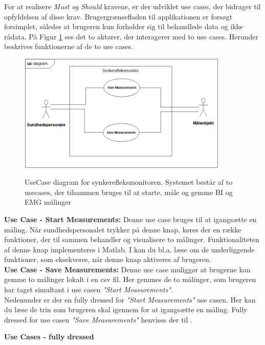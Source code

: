 \pagebreak
For at realisere \textit{Must og Should } kravene, er der udviklet use cases, der bidrager til opfyldelsen af disse krav. Brugergrænsefladen til applikationen er forsøgt forsimplet, således at brugeren kun forholder sig til behandlede data og ikke rådata. På Figur \ref{UseCaseV1} ses det to aktører, der interagerer med to use cases.  Herunder beskrives funktionerne af de to use cases. 


\begin{figure}[H]
\centering
{\includegraphics[width=10cm]
{Figure/usecasediagram}}
\caption{UseCase diagram for synkerefleksmonitoren. Systemet består af to usecases, der tilsammen bruges til at starte, måle og gemme BI og EMG målinger}
\label{UseCaseV1}
\end{figure}

\textbf{Use Case - Start Measurements:}
Denne use case bruges til at igangsætte en måling. Når sundhedspersonalet trykker på denne knap, køres der en række funktioner, der til sammen behandler og visualisere to målinger. Funktionaliteten af denne knap implementeres i Matlab. I   kan du bl.a. læse om de underliggende funktioner, som eksekveres, når denne knap aktiveres af brugeren.\\

\textbf{Use Case - Save Measurements:}
Denne use case muliggør at brugerne kan gemme to målinger lokalt i en csv fil. Her gemmes de to målinger, som brugeren har taget simultant i use casen \textit{"Start Measurements".} \\
 
 
 \pagebreak
Nedenunder er der en fully dressed for \textit{"Start Measurements"} use casen. Her kan du læse de trin som brugeren skal igennem for at igangsætte en måling. Fully dressed for use casen \textit{"Save Measurements"} henvises der til . 

\textbf{Use Cases - fully dressed  } 


